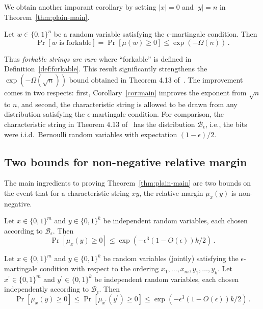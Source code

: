 We obtain another imporant corollary by setting $|x| = 0$ and $|y| = n$ in Theorem~\ref{thm:plain-main}. 
\begin{corollary}\label{coro:forkable-rare}%
  Let $w \in \{0,1\}^n$ be a random variable satisfying the $\epsilon$-martingale condition. Then
  \[
    \Pr[\text{$w$ is forkable}] = \Pr[\mu(w) \geq 0] \leq \exp(-\Omega(n))
    \,.
  \]
\end{corollary}
Thus \emph{forkable strings are rare} 
where ``forkable'' is defined in Definition~\ref{def:forkable}.
This result 
significantly strengthens the $\exp(-\Omega(\sqrt{n}))$ 
bound obtained in Theorem 4.13 of~\cite{KRDO17}. 
The improvement comes in two respects: 
first, Corollary~\ref{cor:main} improves the exponent from $\sqrt{n}$ to $n$, 
and second, the characteristic string is allowed to be drawn 
from any distribution satisfying the $\epsilon$-martingale condition. 
For comparison, the characteristic string in Theorem 4.13 of~\cite{KRDO17} 
has the distribution $\mathcal{B}_\epsilon$, i.e., 
the bits were i.i.d.\ Bernoulli random variables 
with expectation $(1 - \epsilon)/2$.




\subsection{Two bounds for non-negative relative margin}\label{sec:bounds}
The main ingredients to proving Theorem~\ref{thm:plain-main} 
are two bounds on the event that for a characteristic string $xy$, 
the relative margin $\mu_x(y)$ is non-negative. 

\begin{bound}\label{bound:analytic}
  Let $x \in \{0,1\}^m$ and $y \in \{0,1\}^k$ be independent random
  variables, each chosen according to $\mathcal{B}_\epsilon$. Then
  \[
    \Pr[\mu_x(y) \geq 0] 
      \leq \exp({-\epsilon^3 (1 - O(\epsilon)) k/2})
    \,.
  \]
\end{bound}


\begin{bound}\label{bound:geometric}
  Let $x \in \{0,1\}^m$ and $y \in \{0,1\}^k$ be random variables
  (jointly) satisfying the $\epsilon$-martingale condition with
  respect to the ordering $x_1, \ldots, x_m, y_1, \ldots, y_k$.  Let
  $x^\prime \in \{0,1\}^m$ and $y^\prime \in \{0,1\}^k$ be independent
  random variables, each chosen independently according to
  $\mathcal{B}_\epsilon$.  Then
  \[
    \Pr[\mu_x(y) \geq 0] \leq \Pr[\mu_{x^\prime}(y^\prime) \geq 0]
      \leq \exp({-\epsilon^3 (1 - O(\epsilon)) k/2})
    \,.
  \]
\end{bound}

